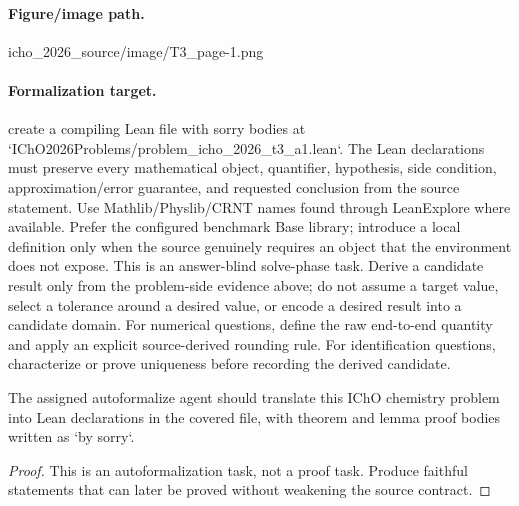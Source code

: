 \paragraph{Figure/image path.}
icho\_2026\_source/image/T3\_page-1.png

\paragraph{Formalization target.}
create a compiling Lean file with sorry bodies at `IChO2026Problems/problem\_icho\_2026\_t3\_a1.lean`.
The Lean declarations must preserve every mathematical object, quantifier, hypothesis, side condition, approximation/error guarantee, and requested conclusion from the source statement.
Use Mathlib/Physlib/CRNT names found through LeanExplore where available. Prefer the configured benchmark Base library; introduce a local definition only when the source genuinely requires an object that the environment does not expose.
This is an answer-blind solve-phase task. Derive a candidate result only from the problem-side evidence above; do not assume a target value, select a tolerance around a desired value, or encode a desired result into a candidate domain.
For numerical questions, define the raw end-to-end quantity and apply an explicit source-derived rounding rule. For identification questions, characterize or prove uniqueness before recording the derived candidate.

\begin{theorem}
\label{thm:physics:icho_2026_t3_a1:target}
The assigned autoformalize agent should translate this IChO chemistry problem into Lean declarations in the covered file, with theorem and lemma proof bodies written as `by sorry`.
\end{theorem}
\begin{proof}
This is an autoformalization task, not a proof task. Produce faithful statements that can later be proved without weakening the source contract.
\end{proof}
